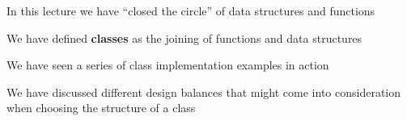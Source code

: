 \documentclass{beamer}
\begin{document}
\begin{slide}{
\item In this lecture we have ``closed the circle'' of data structures and functions
\item We have defined \textbf{classes} as the joining of functions and data structures
\item We have seen a series of class implementation examples in action
\item We have discussed different design balances that might come into consideration when choosing the structure of a class
}\end{slide}

\begin{thankyou}
\end{thankyou}
\end{document}
